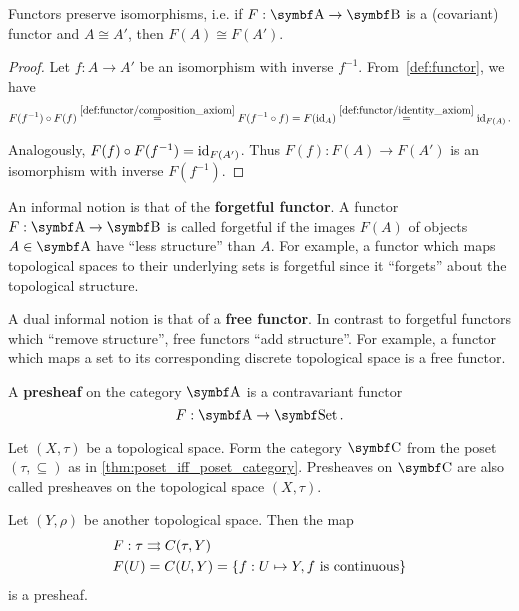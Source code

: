 \begin{proposition}\label{thm:functors_preserve_isomorphisms}\cite[exercise 1.2.21]{Leinster2014}
  Functors preserve isomorphisms, i.e. if \( F: \Bold A \to \Bold B \) is a (covariant) functor and \( A \cong A' \), then \( F(A) \cong F(A') \).
\end{proposition}
\begin{proof}
  Let \( f: A \to A' \) be an isomorphism with inverse \( f^{-1} \). From~\cref{def:functor}, we have
  \begin{align*}
    F(f^{-1}) \circ F(f)
    \overset{\ref{def:functor/composition_axiom}} =
    F(f^{-1} \circ f)
    =
    F(\operatorname{id}_A)
    \overset{\ref{def:functor/identity_axiom}} =
    \operatorname{id}_{F(A)}.
  \end{align*}

  Analogously, \( F(f) \circ F(f^{-1}) = \operatorname{id}_{F(A')} \). Thus \( F(f): F(A) \to F(A') \) is an isomorphism with inverse \( F(f^{-1}) \).
\end{proof}

\begin{note}\label{note:forgetful_free_functor}\cite[examples 1.2.3, 1.2.4]{Leinster2014}
  An informal notion is that of the \textbf{forgetful functor}. A functor \( F: \Bold A \to \Bold B \) is called forgetful if the images \( F(A) \) of objects \( A \in \Bold A \) have \enquote{less structure} than \( A \). For example, a functor which maps topological spaces to their underlying sets is forgetful since it \enquote{forgets} about the topological structure.

  A dual informal notion is that of a \textbf{free functor}. In contrast to forgetful functors which \enquote{remove structure}, free functors \enquote{add structure}. For example, a functor which maps a set to its corresponding discrete topological space is a free functor.
\end{note}

\begin{definition}\label{def:presheaf}\cite[definition 1.2.15]{Leinster2014}
  A \textbf{presheaf} on the category \( \Bold A \) is a contravariant functor
  \begin{equation*}
    F: \Bold A \to \Bold{Set}.
  \end{equation*}
\end{definition}

\begin{example}\label{ex:topological_space_presheaf}\cite[24]{Leinster2014}
  Let \( (X, \tau) \) be a topological space. Form the category \( \Bold C \) from the poset \( (\tau, \subseteq) \) as in \cref{thm:poset_iff_poset_category}. Presheaves on \( \Bold C \) are also called presheaves on the topological space \( (X, \tau) \).

  Let \( (Y, \rho) \) be another topological space. Then the map
  \begin{align*}
    &F: \tau \rightrightarrows C(\tau, Y) \\
    &F(U) = C(U, Y) = \{ f: U \mapsto Y, f \text{ is continuous} \}
  \end{align*}
  is a presheaf.
\end{example}

